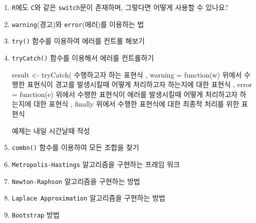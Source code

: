 \documentclass{article}
\begin{document}
\begin{enumerate}
\item \texttt{R}에도 \texttt{C}와 같은 \texttt{switch}문이 존재하며, 그렇다면 어떻게 사용할 수 있나요? 

\item \texttt{warning}(경고)와 \texttt{error}(에러)를 이용하는 법

\item \texttt{try()} 함수를 이용하여 에러를 컨트롤 해보기

\item \texttt{tryCatch()} 함수를 이용해서 에러를 컨트롤하기

\begin{Schunk}
\begin{Soutput}
result <- tryCatch(
{
	수행하고자 하는 표현식
},
warning = function(w) {
	위에서 수행한 표현식이 경고를 발생시킬때 어떻게 처리하고자 하는지에 대한 표현식
},
error = function(e) {
	위에서 수행한 표현식이 에러를 발생시킬때 어떻게 처리하고자 하는지에 대한 표현식
}, finally {
	위에서 수행한 표현식에 대한 최종적 처리를 위한 표현식
}
\end{Soutput}
\end{Schunk}

예제는 내일 시간날때 작성
\item \texttt{combn()} 함수를 이용하여 모든 조합을 찾기

\item \texttt{Metropolis-Hastings} 알고리즘을 구현하는 프레임 워크

\item \texttt{Newton-Raphson} 알고리즘을 구현하는 방법 

\item \texttt{Laplace Approximation} 알고리즘을 구현하는 방법 

\item \texttt{Bootstrap} 방법
\end{enumerate}



%
%
\end{document}
